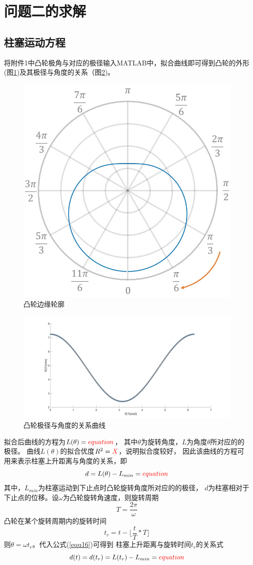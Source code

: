 \documentclass[withoutpreface,bwprint]{cumcmthesis} %
\begin{document}
\section{问题二的求解}
\subsection{柱塞运动方程}
    将附件1中凸轮极角与对应的极径输入MATLAB中，拟合曲线即可得到凸轮的外形
    (图\ref{figure10})及其极径与角度的关系（图\ref{figure11})。
    \begin{figure}[!h]
        \centering
        \includegraphics[width=.3\textwidth]{wheel.jpg}
        \caption{凸轮边缘轮廓}
        \label{figure10}
    \end{figure}
    \begin{figure}[htbp]
        \centering
        \includegraphics[width=.9\textwidth]{wheel_equ.jpg}
        \caption{凸轮极径与角度的关系曲线}
        \label{figure11}
    \end{figure}
    
    拟合后曲线的方程为$L(\theta)={\color{red}equation}$，
    其中$\theta$为旋转角度，$L$为角度$\theta$所对应的的极径。
    曲线$L(\theta)$的拟合优度$R^2={\color{red}X}$，说明拟合度较好，
    因此该曲线的方程可用来表示柱塞上升距离与角度的关系，即
    \begin{equation}
        d=L(\theta)-L_{min}={\color{red}equation}
    \label{equ16}
    \end{equation}
    其中，$L_{min}$为柱塞运动到下止点时凸轮旋转角度所对应的的极径，
    $d$为柱塞相对于下止点的位移。设$\omega$为凸轮旋转角速度，则旋转周期
    \begin{equation}
        T=\frac{2\pi}{\omega}
    \label{equ16.1}
    \end{equation}
    凸轮在某个旋转周期内的旋转时间
    \begin{equation}
        t_r=t-\lfloor{\frac{t}{T}*T}\rfloor
    \label{equ17}
    \end{equation}
    则$\theta=\omega t_r$。代入公式(\ref{equ16})可得到
    柱塞上升距离与旋转时间$t_r$的关系式
    \begin{equation}
        d(t)=d(t_r)=L(t_r)-L_{min}={\color{red}equation}
    \label{equ18}
    \end{equation}
   
\end{document}
